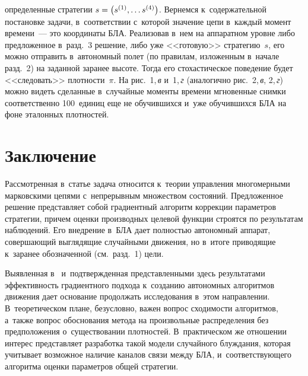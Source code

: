 \begin{multicols}{2}

\noindent
 определенные стратегии 
$s\hm= \left( s^{(1)}, \ldots s^{(4)}\right)$. Вернемся к~содержательной 
постановке задачи, в~соответствии с~которой значение цепи в~каж\-дый 
момент времени~--- это координаты БЛА. Реализовав в~нем на аппаратном 
уровне либо предложенное в~разд.~3 решение, либо уже <<готовую>> 
стратегию~$s$, его мож\-но отправить в~автономный полет (по правилам, 
изложенным в~начале разд.~2) на заданной заранее высоте. Тогда его 
сто\-ха\-сти\-че\-ское поведение будет <<следовать>> плот\-ности~$\pi$. На 
рис.~1,\,\textit{в} и~1,\,\textit{г} (аналогично рис.~2,\,\textit{в}, 2,\,\textit{г}) мож\-но видеть 
сделанные в~случайные моменты времени мгновенные снимки 
соответственно 100~единиц еще не обучив\-ших\-ся и~уже обучив\-ших\-ся БЛА на 
фоне эталонных плотностей. 

\vspace*{-6pt}
  
  \section{Заключение}
  
  \vspace*{-2pt}
  
  Рассмотренная в~статье задача относится к~теории управ\-ле\-ния 
многомерными марковскими цепями с~непрерывным множеством состояний. 
Предложенное решение представляет собой градиентный алгоритм 
коррекции па\-ра\-мет\-ров стратегии, причем оценки производных целевой 
функции строятся по результатам наблюдений. Его внедрение в~БЛА дает 
пол\-ностью автономный аппарат, со\-вер\-ша\-ющий выглядящие случайными 
движения, но в~итоге приводящие к~заранее обозначенной (см.\ разд.~1) 
цели. 
  
  Выявленная в~\cite{1-kraz} и~под\-тверж\-ден\-ная пред\-став\-лен\-ны\-ми здесь 
результатами эф\-фек\-тив\-ность градиентного подхода к~созданию автономных 
алгоритмов движения дает основание продолжать \mbox{исследо\-ва\-ния} в~этом 
направлении. В~тео\-ре\-ти\-че\-ском плане, безусловно, важен вопрос схо\-ди\-мости 
алгоритмов, а~так\-же вопрос обоснования метода на произвольные 
распределения без предположения о~существовании плотностей. 
В~практическом же отношении интерес представляет разработка такой 
модели случайного блуж\-да\-ния, которая учитывает возможное наличие 
каналов связи между БЛА, и~со\-от\-вет\-ст\-ву\-юще\-го алгоритма оцен\-ки 
па\-ра\-мет\-ров об\-щей стратегии. 


\end{multicols}
